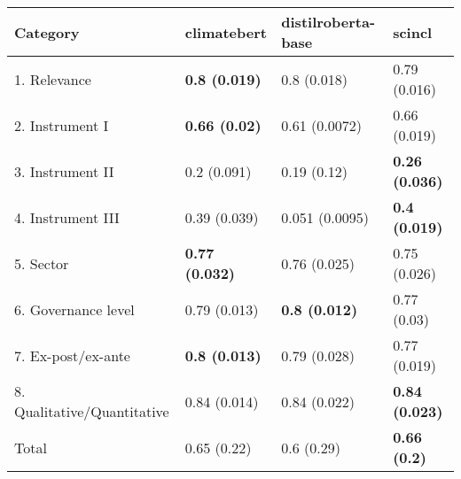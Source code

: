 \begin{tabular}{llll}
\toprule
Category & climatebert & distilroberta-base & scincl \\
\midrule
1. Relevance & \textbf{0.8 (0.019)} & 0.8 (0.018) & 0.79 (0.016) \\
2. Instrument I & \textbf{0.66 (0.02)} & 0.61 (0.0072) & 0.66 (0.019) \\
3. Instrument II & 0.2 (0.091) & 0.19 (0.12) & \textbf{0.26 (0.036)} \\
4. Instrument III & 0.39 (0.039) & 0.051 (0.0095) & \textbf{0.4 (0.019)} \\
5. Sector & \textbf{0.77 (0.032)} & 0.76 (0.025) & 0.75 (0.026) \\
6. Governance level & 0.79 (0.013) & \textbf{0.8 (0.012)} & 0.77 (0.03) \\
7. Ex-post/ex-ante & \textbf{0.8 (0.013)} & 0.79 (0.028) & 0.77 (0.019) \\
8. Qualitative/Quantitative & 0.84 (0.014) & 0.84 (0.022) & \textbf{0.84 (0.023)} \\
Total & 0.65 (0.22) & 0.6 (0.29) & \textbf{0.66 (0.2)} \\
\bottomrule
\end{tabular}
